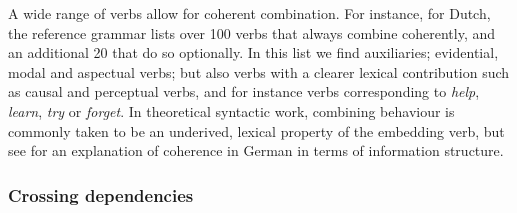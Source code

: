 \documentclass[output=paper,hidelinks]{langscibook}
\begin{document}
A wide range of verbs allow for coherent combination. For instance, for Dutch, 
the reference grammar \citet{haeseryn-ed:1997} lists over 100
verbs that always combine coherently, and an additional 20 that do
so optionally. In this list we find auxiliaries; evidential, modal and aspectual
verbs; but also verbs with a clearer lexical contribution such as
causal and perceptual verbs, and for instance verbs corresponding to
\textit{help}, \textit{learn}, \textit{try} or \textit{forget}. In
theoretical syntactic work, combining behaviour is commonly taken to
be an underived, lexical property of the embedding 
verb, but see \citet{cook:2001:revdiss} for an
explanation of coherence in German in
terms of information structure.

\subsubsection{Crossing dependencies\label{sec:Germanic:xingdeps}}
\end{document}

